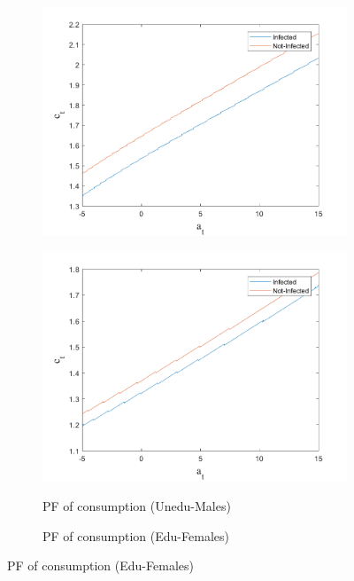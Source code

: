 \begin{figure}
\begin{subfigure}{0.5\textwidth}
   \includegraphics[width=\linewidth,height = 0.22\textheight]{figures/mio/FIG6.png}
    \label{fig_dert}
\end{subfigure}
\hspace*{\fill}
\begin{subfigure}{0.5\textwidth}\caption{PF of consumption (Unedu-Males)}
   \includegraphics[width=\linewidth,height = 0.22\textheight]{figures/mio/FIG5.png}
    \label{fig:x_b}
\end{subfigure}
\bigskip
\begin{subfigure}{0.5\textwidth}\caption{PF of consumption (Edu-Females)}

\end{subfigure}
\end{figure}
